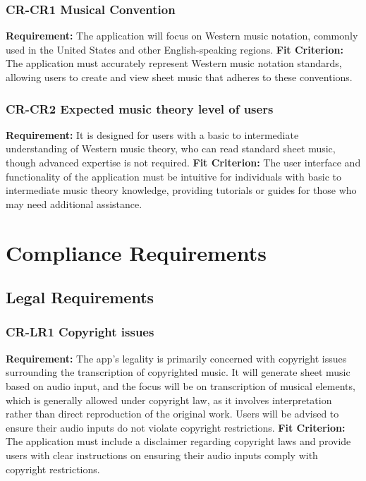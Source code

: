 \documentclass[12pt]{article}
\begin{document}
\subsubsection*{CR-CR1 Musical Convention}
\textbf{Requirement: }The application will focus on Western music notation, commonly used in the United States and other English-speaking regions. 
\textbf{Fit Criterion:} The application must accurately represent Western music notation standards, allowing users to create and view sheet music that adheres to these conventions.

\subsubsection*{CR-CR2 Expected music theory level of users}
\textbf{Requirement: }It is designed for users with a basic to intermediate understanding of Western music theory, who can read standard sheet music, though advanced expertise is not required.
\textbf{Fit Criterion:} The user interface and functionality of the application must be intuitive for individuals with basic to intermediate music theory knowledge, providing tutorials or guides for those who may need additional assistance.

\section{Compliance Requirements}
\subsection{Legal Requirements}

\subsubsection*{CR-LR1 Copyright issues}
\textbf{Requirement: }The app’s legality is primarily concerned with copyright issues surrounding the transcription of copyrighted music. It will generate sheet music based on audio input, and the focus will be on transcription of musical elements, which is generally allowed under copyright law, as it involves interpretation rather than direct reproduction of the original work. Users will be advised to ensure their audio inputs do not violate copyright restrictions.
\textbf{Fit Criterion:} The application must include a disclaimer regarding copyright laws and provide users with clear instructions on ensuring their audio inputs comply with copyright restrictions.
\end{document}
